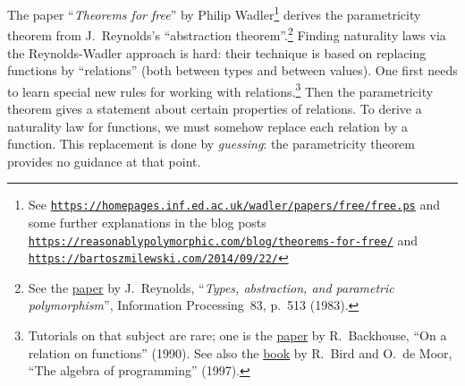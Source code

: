 \noindent {}The paper \textsf{``}\emph{Theorems for free}\textsf{''}
by Philip Wadler\footnote{See \texttt{\href{https://homepages.inf.ed.ac.uk/wadler/papers/free/free.ps}{https://homepages.inf.ed.ac.uk/wadler/papers/free/free.ps}}
and some further explanations in the blog posts \texttt{\href{https://reasonablypolymorphic.com/blog/theorems-for-free/}{https://reasonablypolymorphic.com/blog/theorems-for-free/}}
and \texttt{\href{https://bartoszmilewski.com/2014/09/22/}{https://bartoszmilewski.com/2014/09/22/}}} derives the parametricity theorem from J.~Reynolds\textsf{'}s \textsf{``}abstraction
theorem\textsf{''}.\footnote{See the \href{https://people.mpi-sws.org/~dreyer/tor/papers/reynolds.pdf}{paper}
by J.~Reynolds, \textsf{``}\emph{Types, abstraction, and parametric polymorphism}\textsf{''},
Information Processing~83, p.~513 (1983).} Finding naturality laws via the Reynolds-Wadler approach is hard:
their technique is based on replacing functions by \textsf{``}relations\textsf{''}
(both between types and between values). One first needs to learn
special new rules for working with relations.\footnote{Tutorials on that subject are rare; one is the \href{https://www.researchgate.net/publication/262348393_On_a_Relation_on_Functions}{paper}
by R.~Backhouse, \textsf{``}On a relation on functions\textsf{''}
(1990). See also the \href{https://themattchan.com/docs/algprog.pdf}{book}
by R.~Bird and O.~de Moor, \textsf{``}The algebra of
programming\textsf{''} (1997).} Then the parametricity theorem gives a statement about certain properties
of relations. To derive a naturality law for functions, we must somehow
replace each relation by a function. This replacement is done by \emph{guessing}:
the parametricity theorem provides no guidance at that point.

